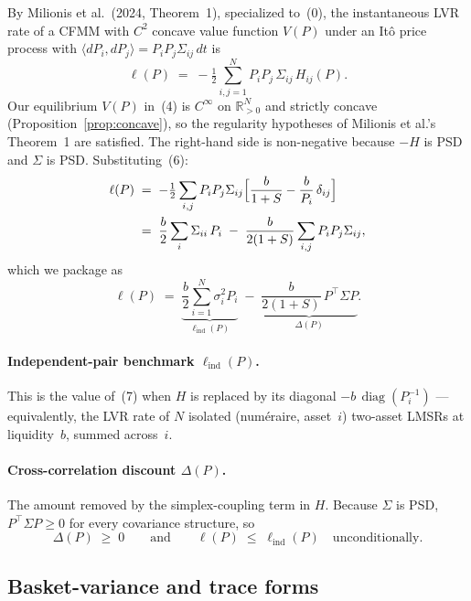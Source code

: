 \documentclass[11pt]{article}
\DeclareMathOperator{\diag}{diag}
\newcommand{\R}{\mathbb{R}}
\newcommand{\ind}{\mathrm{ind}}
\newcommand{\transp}{^{\!\top}}
\begin{document}
By Milionis et al.\ (2024, Theorem~1), specialized to~(0), the instantaneous LVR rate of a CFMM with $C^2$ concave value function $V(P)$ under an It\^o price process with $\langle dP_i, dP_j\rangle = P_i P_j \Sigma_{ij}\,dt$ is
\begin{equation*}
\ell(P) \;=\; -\tfrac{1}{2}\sum_{i,j=1}^N P_i P_j \,\Sigma_{ij}\, H_{ij}(P). \tag{7}
\end{equation*}
Our equilibrium $V(P)$ in~(4) is $C^\infty$ on $\R^N_{>0}$ and strictly concave (Proposition~\ref{prop:concave}), so the regularity hypotheses of Milionis et al.'s Theorem~1 are satisfied. The right-hand side is non-negative because $-H$ is PSD and $\Sigma$ is PSD. Substituting~(6):
\begin{align*}
\ell(P)
&\;=\; -\tfrac{1}{2}\sum_{i,j} P_i P_j \Sigma_{ij}\Bigl[\frac{b}{1+S} - \frac{b}{P_i}\,\delta_{ij}\Bigr] \\
&\;=\; \frac{b}{2}\sum_i \Sigma_{ii}\, P_i \;-\; \frac{b}{2(1+S)}\sum_{i,j} P_i P_j \Sigma_{ij},
\end{align*}
which we package as
\begin{equation*}
\boxed{\;\; \ell(P) \;=\; \underbrace{\frac{b}{2}\sum_{i=1}^N \sigma_i^2 P_i}_{\ell_{\ind}(P)} \;-\; \underbrace{\frac{b}{2(1+S)}\, P\transp\Sigma P}_{\Delta(P)}. \;\;} \tag{$\dagger$}
\end{equation*}

\paragraph{Independent-pair benchmark $\ell_{\ind}(P)$.} This is the value of~(7) when $H$ is replaced by its diagonal $-b\,\diag(P_i^{-1})$ --- equivalently, the LVR rate of $N$ isolated (num\'eraire, asset~$i$) two-asset LMSRs at liquidity~$b$, summed across~$i$.

\paragraph{Cross-correlation discount $\Delta(P)$.} The amount removed by the simplex-coupling term in $H$. Because $\Sigma$ is PSD, $P\transp\Sigma P \ge 0$ for every covariance structure, so
\[
\Delta(P) \;\ge\; 0 \qquad\text{and}\qquad \ell(P) \;\le\; \ell_{\ind}(P) \quad \text{unconditionally}.
\]

\subsection{Basket-variance and trace forms}
\end{document}
